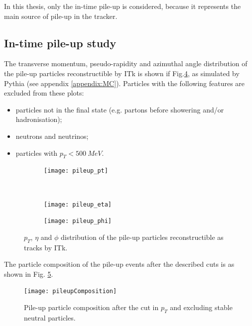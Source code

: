 \documentclass[a4paper,twoside,12pt]{article}
\begin{document}
In this thesis, only the in-time pile-up is considered, because it represents the main source of
pile-up in the tracker.

\subsection{In-time pile-up study}

The transverse momentum, pseudo-rapidity and azimuthal angle distribution of the pile-up particles reconstructible by ITk is shown if Fig.\ref{fig:pileupDists}, as simulated by 
Pythia (see appendix \ref{appendix:MC}). Particles with the following
features are excluded from these plots:

\begin{itemize}
\item particles not in the final state (e.g. partons before showering and/or hadronisation);
\item neutrons and neutrinos;
\item particles with $p_{T} < 500\ MeV$.
\end{itemize}

\begin{figure}
\begin{subfigure}{\linewidth}
\texttt{[image: pileup\_pt]}
\caption{}
\label{fig:pileup_pt}
\end{subfigure}\\[1ex]
\begin{subfigure}{.5\linewidth}
\centering
\texttt{[image: pileup\_eta]}
\caption{}
\label{fig:pileup_eta}
\end{subfigure}
\begin{subfigure}{.5\linewidth}
\centering
\texttt{[image: pileup\_phi]}
\caption{}
\label{fig:pileup_phi}
\end{subfigure}
\caption{$p_{T}$, $\eta$ and $\phi$ distribution of the pile-up particles reconstructible as tracks by ITk.}
\label{fig:pileupDists}
\end{figure}

The particle composition of the pile-up events after the described cuts is as shown in Fig.
\ref{fig:pileupComposition}. 

\begin{figure} [h]
	\texttt{[image: pileupComposition]}
	\caption{Pile-up particle composition after the cut in $p_{T}$ and excluding stable neutral particles.}
	\label{fig:pileupComposition}
\end{figure}
\end{document}
